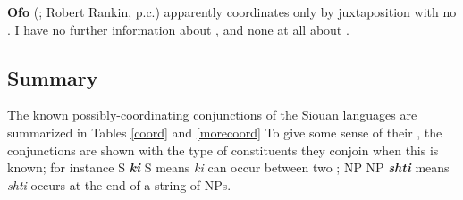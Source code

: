 \documentclass[output=paper]{LSP/langsci}
\begin{document}
\textbf{Ofo} (\citealt{DorseySwanton1912}; Robert Rankin, p.c.) apparently coordinates  only by juxtaposition with no . I have no further information about  , and none at all about .

\subsection{Summary}

The known possibly-coordinating conjunctions of the Siouan languages are summarized in Tables \ref{coord} and \ref{morecoord} To give some sense of their , the conjunctions are shown with the type of constituents they conjoin when this is known; for instance S \textit{\textbf{ki}} S means \textit{ki} can occur between two ; NP NP \textit{\textbf {shti}} means \textit {shti} occurs at the end of a string of NPs.
\end{document}
